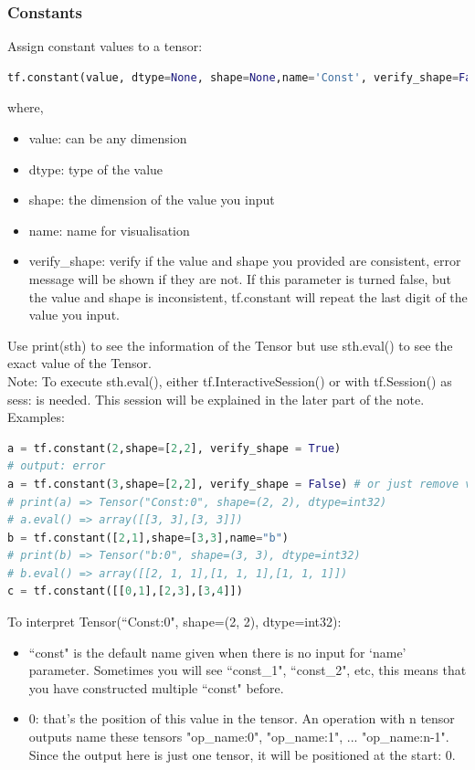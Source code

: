 \documentclass{article}
\begin{document}
	\subsubsection{Constants}
	Assign constant values to a tensor:
\begin{lstlisting}[numbers=none,language=Python,morekeywords ={as}]
tf.constant(value, dtype=None, shape=None,name='Const', verify_shape=False)
\end{lstlisting}
	where,
	\begin{itemize}[noitemsep]
		\item \colorbox{backcolour}{value}: can be any dimension
		\item \colorbox{backcolour}{dtype}: type of the value
		\item \colorbox{backcolour}{shape}: the dimension of the value you input 
		\item \colorbox{backcolour}{name}: name for visualisation
		\item \colorbox{backcolour}{verify\_shape}: verify if the value and shape you provided are consistent, error message will be shown if they are not. If this parameter is turned false, but the value and shape is inconsistent, tf.constant will repeat the last digit of the value you input.
	\end{itemize}
	Use \colorbox{backcolour}{print(sth)} to see the information of the Tensor but use \colorbox{backcolour}{sth.eval()} to see the exact value of the Tensor.\\
	Note: To execute \colorbox{backcolour}{sth.eval()}, either \colorbox{backcolour}{tf.InteractiveSession()} or \colorbox{backcolour}{with tf.Session() as sess:} is needed. This session will be explained in the later part of the note.\\
		Examples:
\begin{lstlisting}[numbers=none,language=Python,morekeywords ={as}]
a = tf.constant(2,shape=[2,2], verify_shape = True)
# output: error
a = tf.constant(3,shape=[2,2], verify_shape = False) # or just remove verify_shape
# print(a) => Tensor("Const:0", shape=(2, 2), dtype=int32)
# a.eval() => array([[3, 3],[3, 3]])
b = tf.constant([2,1],shape=[3,3],name="b")
# print(b) => Tensor("b:0", shape=(3, 3), dtype=int32)
# b.eval() => array([[2, 1, 1],[1, 1, 1],[1, 1, 1]])
c = tf.constant([[0,1],[2,3],[3,4]])
\end{lstlisting}
To interpret Tensor(``Const:0", shape=(2, 2), dtype=int32):
\begin{itemize}
	\item ``const" is the default name given when there is no input for `name' parameter. Sometimes you will see ``const\_1", ``const\_2", etc, this means that you have constructed multiple ``const" before.
	\item 0: that's the position of this value in the tensor. An operation with n tensor outputs name these tensors "op\_name:0", "op\_name:1", ... "op\_name:n-1". Since the output here is just one tensor, it will be positioned at the start: 0.
\end{itemize}
\end{document}

